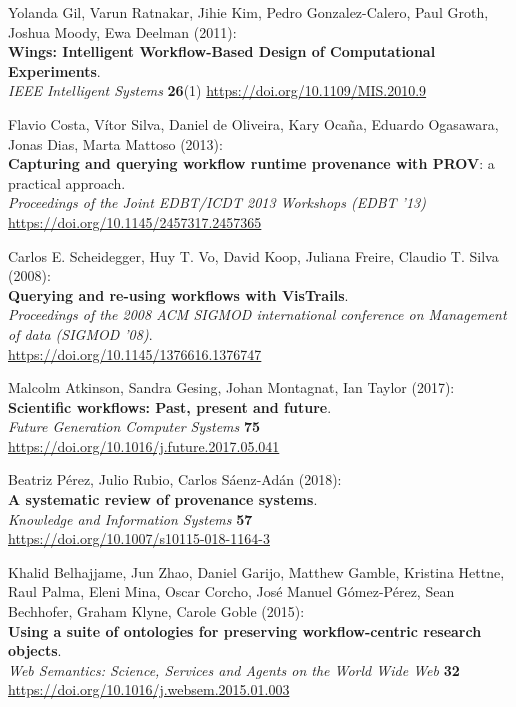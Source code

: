 \documentclass[10pt,letterpaper]{article}
\begin{document}
\begin{thebibliography}{10}
\begin{small}
Yolanda Gil, Varun Ratnakar, Jihie Kim, Pedro Gonzalez-Calero, Paul Groth, Joshua Moody, Ewa Deelman (2011):\\
\textbf{Wings: Intelligent Workflow-Based Design of Computational Experiments}.\\
\emph{IEEE Intelligent Systems} \textbf{26}(1)
\url{https://doi.org/10.1109/MIS.2010.9}

Flavio Costa, Vítor Silva, Daniel de Oliveira, Kary Ocaña, Eduardo Ogasawara, Jonas Dias, Marta Mattoso (2013):\\
\textbf{Capturing and querying workflow runtime provenance with PROV}: a practical approach.\\
\emph{Proceedings of the Joint EDBT/ICDT 2013 Workshops (EDBT '13)}\\
\url{https://doi.org/10.1145/2457317.2457365} 


 Carlos E. Scheidegger, Huy T. Vo, David Koop, Juliana Freire, Claudio T. Silva (2008):\\
\textbf{Querying and re-using workflows with VisTrails}.\\
\emph{Proceedings of the 2008 ACM SIGMOD international conference on Management of data (SIGMOD '08)}.\\
\url{https://doi.org/10.1145/1376616.1376747}

Malcolm Atkinson, Sandra Gesing, Johan Montagnat, Ian Taylor (2017):\\
\textbf{Scientific workflows: Past, present and future}.\\
\emph{Future Generation Computer Systems} \textbf{75}\\
\url{https://doi.org/10.1016/j.future.2017.05.041}

Beatriz Pérez, Julio Rubio, Carlos Sáenz-Adán (2018):\\
\textbf{A systematic review of provenance systems}.\\
\emph{Knowledge and Information Systems} \textbf{57}\\
\url{https://doi.org/10.1007/s10115-018-1164-3} 


Khalid Belhajjame, Jun Zhao, Daniel Garijo, Matthew Gamble, Kristina Hettne, Raul Palma, Eleni Mina, Oscar Corcho, José Manuel Gómez-Pérez, Sean Bechhofer, Graham Klyne, Carole Goble
(2015):\\
\textbf{Using a suite of ontologies for preserving workflow-centric research objects}.\\
\emph{Web Semantics: Science, Services and Agents on the World Wide Web} \textbf{32}\\
\url{https://doi.org/10.1016/j.websem.2015.01.003}



\end{small}
\end{thebibliography}
\end{document}
